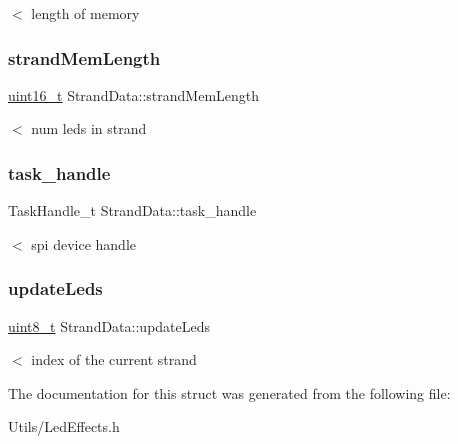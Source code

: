 $<$ length of memory \mbox{\label{structStrandData_aab77bb0d9f8a632662647c3aab7cf851}} 
\subsubsection{\texorpdfstring{strand\+Mem\+Length}{strandMemLength}}
{\footnotesize\ttfamily \hyperlink{vl53l0x__types_8h_a273cf69d639a59973b6019625df33e30}{uint16\+\_\+t} Strand\+Data\+::strand\+Mem\+Length}

$<$ num leds in strand \mbox{\label{structStrandData_a0fbcfc7622e746b01484b7b943ffa913}} 
\subsubsection{\texorpdfstring{task\+\_\+handle}{task\_handle}}
{\footnotesize\ttfamily Task\+Handle\+\_\+t Strand\+Data\+::task\+\_\+handle}

$<$ spi device handle \mbox{\label{structStrandData_aff0894a9f07ac931f5242bc849b02a33}} 
\subsubsection{\texorpdfstring{update\+Leds}{updateLeds}}
{\footnotesize\ttfamily \hyperlink{vl53l0x__types_8h_aba7bc1797add20fe3efdf37ced1182c5}{uint8\+\_\+t} Strand\+Data\+::update\+Leds}

$<$ index of the current strand 

The documentation for this struct was generated from the following file\+:\begin{DoxyCompactItemize}
\item 
Utils/Led\+Effects.\+h\end{DoxyCompactItemize}
